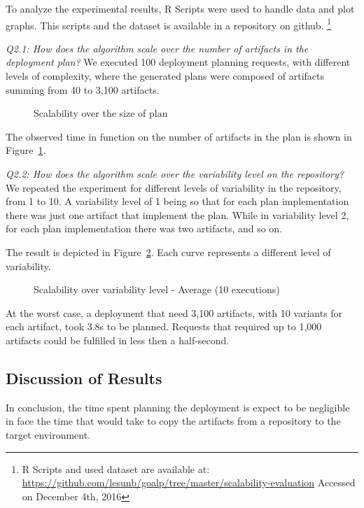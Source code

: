 To analyze the experimental results, R Scripts\cite{the_r_foundation_r_2016} were used to handle data and plot graphs. This scripts and the dataset is available in a repository on github.
\footnote{R Scripts and used dataset are available at:
\url{https://github.com/lesunb/goalp/tree/master/scalability-evaluation} Accessed on December 4th, 2016}

\emph{Q2.1: How does the algorithm scale over the number of artifacts in the deployment plan?} We executed 100 deployment planning requests, with different levels of complexity, where the generated plans were composed of artifacts summing from 40 to 3,100 artifacts.

\begin{figure}[!htb]
  \centering
  \caption{Scalability over the size of plan}
\label{graph_plan_size_and_time}
\end{figure}

The observed time in function on the number of artifacts in the plan is shown in Figure~\ref{graph_plan_size_and_time}.

\emph{Q2.2:  How does the algorithm scale over the variability level on the repository?}
We repeated the experiment for different levels of variability in the repository, from 1 to 10. A variability level of 1 being so that for each plan implementation there was just one artifact that implement the plan. While in variability level 2, for each plan implementation there was two artifacts, and so on.

The result is depicted in Figure~\ref{graph_scalability}. Each curve represents a different level of variability.

\begin{figure}[!htb]
  \centering
  \caption{Scalability over variability level - Average (10 executions)}
\label{graph_scalability}
\end{figure}

At the worst case, a deployment that need 3,100 artifacts, with 10 variants for each artifact, took 3.8s to be planned. Requests that required up to 1,000 artifacts could be fulfilled in less then a half-second.

\subsection{Discussion of Results}

In conclusion, the time spent planning the deployment is expect to be negligible in face the time that would take to copy the artifacts from a repository to the target environment.
